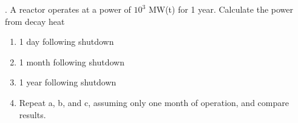 . A reactor operates at a power of $10^3$ MW(t) for 1 year.  Calculate the power from decay heat
\begin{enumerate}[label=(\alph*)]
\item 1 day following shutdown
\item 1 month following shutdown
\item 1 year following shutdown
\item Repeat a, b, and c, assuming only one month of operation, and compare results.
\end{enumerate}



\vspace{0.5cm}
\ifsolved

